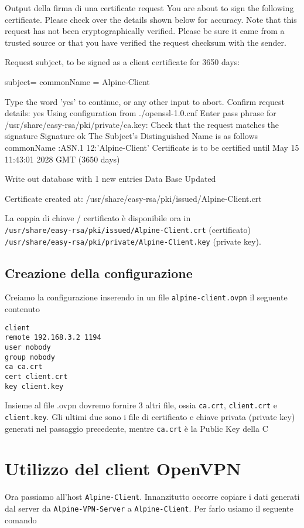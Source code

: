 \documentclass{article}
\newcommand{\hostname}[1]{{\lstinline[basicstyle=\ttfamily\color{teal}]|#1|}}
\newcommand{\path}[1]{{\lstinline[basicstyle=\ttfamily\color{blue}]|#1|}}
\begin{document}
\begin{shelloutput}{Output della firma di una certificate request}
You are about to sign the following certificate.
Please check over the details shown below for accuracy. Note that this request
has not been cryptographically verified. Please be sure it came from a trusted
source or that you have verified the request checksum with the sender.

Request subject, to be signed as a client certificate for 3650 days:

subject=
commonName                = Alpine-Client


Type the word 'yes' to continue, or any other input to abort.
Confirm request details: yes
Using configuration from ./openssl-1.0.cnf
Enter pass phrase for /usr/share/easy-rsa/pki/private/ca.key:
Check that the request matches the signature
Signature ok
The Subject's Distinguished Name is as follows
commonName            :ASN.1 12:'Alpine-Client'
Certificate is to be certified until May 15 11:43:01 2028 GMT (3650 days)

Write out database with 1 new entries
Data Base Updated

Certificate created at: /usr/share/easy-rsa/pki/issued/Alpine-Client.crt
\end{shelloutput}

\vspace{1em}
La coppia di chiave / certificato è disponibile ora in \\
\path{/usr/share/easy-rsa/pki/issued/Alpine-Client.crt}
(certificato) \\ 
\path{/usr/share/easy-rsa/pki/private/Alpine-Client.key} (private key).
\pagebreak
\subsection{Creazione della configurazione}
Creiamo la configurazione inserendo in un file \path{alpine-client.ovpn}
il seguente contenuto
\begin{lstlisting}
client
remote 192.168.3.2 1194
user nobody
group nobody
ca ca.crt
cert client.crt
key client.key
\end{lstlisting}
\vspace{1em}
Insieme al file .ovpn dovremo fornire 3 altri file, ossia \path{ca.crt}, \path{client.crt} e
\path{client.key}. Gli ultimi due sono i file di certificato e chiave privata (private key) 
generati nel passaggio precedente, mentre \path{ca.crt} è la Public Key della C
\pagebreak

\section{Utilizzo del client OpenVPN}
Ora passiamo all'host \hostname{Alpine-Client}. Innanzitutto occorre copiare i dati generati dal server
da \hostname{Alpine-VPN-Server} a \hostname{Alpine-Client}. Per farlo usiamo il seguente comando
\end{document}
